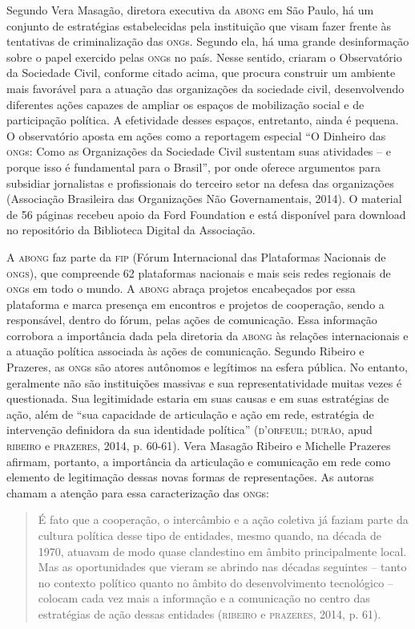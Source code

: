 Segundo Vera Masagão, diretora executiva da \textsc{abong} em São Paulo, há um
conjunto de estratégias estabelecidas pela instituição que visam fazer
frente às tentativas de criminalização das \textsc{ong}s. Segundo ela, há uma
grande desinformação sobre o papel exercido pelas \textsc{ong}s no país. Nesse
sentido, criaram o Observatório da Sociedade Civil, conforme citado
acima, que procura construir um ambiente mais favorável para a atuação
das organizações da sociedade civil, desenvolvendo diferentes ações
capazes de ampliar os espaços de mobilização social e de participação
política. A efetividade desses espaços, entretanto, ainda é pequena. O
observatório aposta em ações como a reportagem especial ``O Dinheiro das
\textsc{ong}s: Como as Organizações da Sociedade Civil sustentam suas atividades
-- e porque isso é fundamental para o Brasil'', por onde oferece
argumentos para subsidiar jornalistas e profissionais do terceiro setor
na defesa das organizações (Associação Brasileira das Organizações
Não Governamentais, 2014). O material de 56 páginas recebeu apoio da
Ford Foundation e está disponível para download no repositório da
Biblioteca Digital da Associação.

A \textsc{abong} faz parte da \textsc{fip} (Fórum Internacional das Plataformas Nacionais
de \textsc{ongs}), que compreende 62 plataformas nacionais e mais seis redes
regionais de \textsc{ong}s em todo o mundo. A \textsc{abong} abraça projetos encabeçados
por essa plataforma e marca presença em encontros e projetos de
cooperação, sendo a responsável, dentro do fórum, pelas ações de
comunicação. Essa informação corrobora a importância dada pela diretoria
da \textsc{abong} às relações internacionais e a atuação política associada às
ações de comunicação. Segundo Ribeiro e Prazeres, as \textsc{ong}s são atores
autônomos e legítimos na esfera pública. No entanto, geralmente não são
instituições massivas e sua representatividade muitas vezes é
questionada. Sua legitimidade estaria em suas causas e em suas
estratégias de ação, além de ``sua capacidade de articulação e ação em
rede, estratégia de intervenção definidora da sua identidade política''
(\textsc{d'orfeuil; durão}, apud \textsc{ribeiro} e \textsc{prazeres}, 2014, p. 60-61). Vera
Masagão Ribeiro e Michelle Prazeres afirmam, portanto, a importância da
articulação e comunicação em rede como elemento de legitimação dessas
novas formas de representações. As autoras chamam a atenção para essa
caracterização das \textsc{ong}s:

\begin{quote}
É fato que a cooperação, o intercâmbio e a ação coletiva já faziam parte
da cultura política desse tipo de entidades, mesmo quando, na década de
1970, atuavam de modo quase clandestino em âmbito principalmente local.
Mas as oportunidades que vieram se abrindo nas décadas seguintes --
tanto no contexto político quanto no âmbito do desenvolvimento
tecnológico -- colocam cada vez mais a informação e a comunicação no
centro das estratégias de ação dessas entidades (\textsc{ribeiro} e \textsc{prazeres},
2014, p. 61).
\end{quote}

